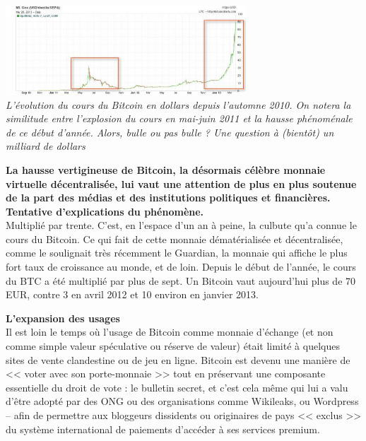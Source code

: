 \documentclass[11pt,twoside,a4paper]{article}
\begin{document}
\begin{minipage}[ht]{9.25cm}
	\includegraphics[width=9.00cm]{img/640-755235.jpg}~\\
	\emph{\small L'{\'e}volution du cours du Bitcoin en dollars depuis l'automne 2010. On notera la similitude entre l'explosion du cours en mai-juin 2011 et la hausse ph{\'e}nom{\'e}nale de ce d{\'e}but d'ann{\'e}e. Alors, bulle ou pas bulle ? Une question {\`a} (bient{\^o}t) un milliard de dollars} ~\\
\end{minipage} \hfill \begin{minipage}[ht]{10.00cm}
	\textbf{La hausse vertigineuse de Bitcoin, la d{\'e}sormais c{\'e}l{\`e}bre monnaie virtuelle d{\'e}centralis{\'e}e, lui vaut une attention de plus en plus soutenue de la part des m{\'e}dias et des institutions politiques et financi{\`e}res. Tentative d'explications du ph{\'e}nom{\`e}ne.} ~\\

	Multipli{\'e} par trente. C'est, en l'espace d'un an {\`a} peine, la culbute qu'a connue le cours du Bitcoin. Ce qui fait de cette monnaie d{\'e}mat{\'e}rialis{\'e}e et d{\'e}centralis{\'e}e, comme le soulignait tr{\`e}s r{\'e}cemment le Guardian, la monnaie qui affiche le plus fort taux de croissance au monde, et de loin. Depuis le d{\'e}but de l'ann{\'e}e, le cours du BTC a {\'e}t{\'e} multipli{\'e} par plus de sept. Un Bitcoin vaut aujourd'hui plus de 70 EUR, contre 3 en avril 2012 et 10 environ en janvier 2013.
\end{minipage}

\textbf{L'expansion des usages} ~\\

Il est loin le temps o{\`u} l'usage de Bitcoin comme monnaie d'{\'e}change (et non comme simple valeur sp{\'e}culative ou r{\'e}serve de valeur) {\'e}tait limit{\'e} {\`a} quelques sites de vente clandestine ou de jeu en ligne. Bitcoin est devenu une mani{\`e}re de << voter avec son porte-monnaie >> tout en pr{\'e}servant une composante essentielle du droit de vote : le bulletin secret, et c'est cela m{\^e}me qui lui a valu d'{\^e}tre adopt{\'e} par des ONG ou des organisations comme Wikileaks, ou Wordpress -- afin de permettre aux bloggeurs dissidents ou originaires de pays << exclus >> du syst{\`e}me international de paiements d'acc{\'e}der {\`a} ses services premium. ~\\
\end{document}
